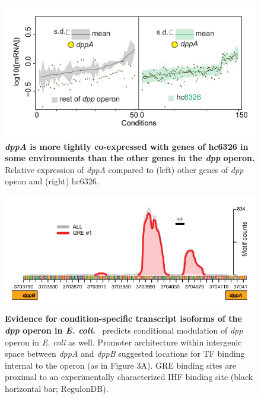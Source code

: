 \begin{figure}[hp]
\centering
\includegraphics[width=0.95\linewidth]{figures/dpp_expression.pdf}
\caption[\textit{dppA} is more tightly co-expressed with genes of hc6326 in some environments than the other genes in the \textit{dpp} operon]{\textbf{\textit{dppA} is more tightly co-expressed with genes of hc6326 in some environments than the other genes in the \textit{dpp} operon.} Relative expression of \textit{dppA} compared to (left) other genes of \textit{dpp} opeon and (right) hc6326.}
\label{fig:dpp_expression}
\end{figure}

\begin{figure}[hp]
\centering
\includegraphics[width=0.95\linewidth]{figures/dpp_ecoli.pdf}
\caption[Evidence for condition-specific transcript isoforms of the \textit{dpp} operon in \textit{E. coli}]{\textbf{Evidence for condition-specific transcript isoforms of the \textit{dpp} operon in \textit{E. coli}.} \egrine~predicts conditional modulation of \textit{dpp} operon in {\it E. coli} as well. Promoter architecture within intergenic space between \textit{dppA} and \textit{dppB} suggested locations for TF binding internal to the operon (as in Figure 3A). GRE binding sites are proximal to an experimentally characterized IHF binding site (black horizontal bar; RegulonDB).}
\label{fig:dpp_ecoli}
\end{figure}

